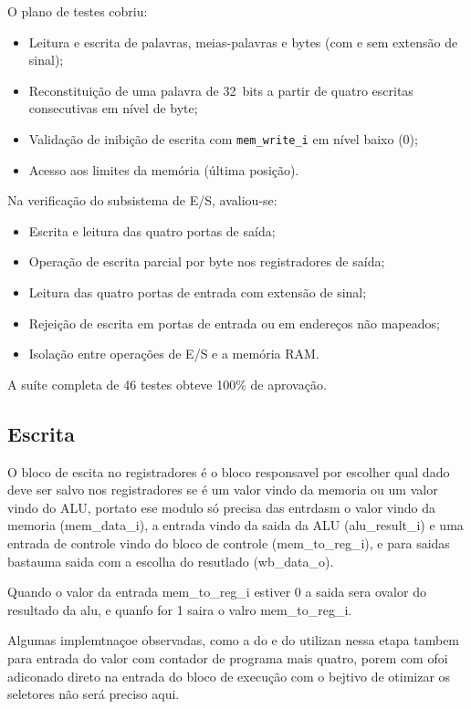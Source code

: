 O plano de testes cobriu:
\begin{itemize}
    \item Leitura e escrita de palavras, meias-palavras e bytes (com e sem extensão de sinal);
    \item Reconstituição de uma palavra de 32~bits a partir de quatro escritas consecutivas em nível de byte;
    \item Validação de inibição de escrita com \texttt{mem\_write\_i} em nível baixo (0);
    \item Acesso aos limites da memória (última posição).
\end{itemize}

Na verificação do subsistema de E/S, avaliou-se:
\begin{itemize}
    \item Escrita e leitura das quatro portas de saída;
    \item Operação de escrita parcial por byte nos registradores de saída;
    \item Leitura das quatro portas de entrada com extensão de sinal;
    \item Rejeição de escrita em portas de entrada ou em endereços não mapeados;
    \item Isolação entre operações de E/S e a memória RAM.
\end{itemize}

A suíte completa de 46 testes obteve 100\% de aprovação.

\subsection{Escrita}
\label{sub:escrita}

O bloco de escita no registradores é o bloco responsavel por escolher qual dado deve ser salvo nos registradores se é um valor vindo da memoria ou um valor vindo do ALU, portato ese modulo só precisa das entrdasm o valor vindo da memoria (mem_data_i), a entrada vindo da saida da ALU (alu_result_i) e uma entrada de controle vindo do bloco de controle (mem_to_reg_i), e para saidas bastauma saida com a escolha do resutlado (wb_data_o).

Quando o valor da entrada mem_to_reg_i estiver 0 a saida sera ovalor do resultado da alu, e quanfo for 1 saira o valro mem_to_reg_i. 

Algumas implemtnaçoe  observadas, como a do e do  utilizan nessa etapa tambem para entrada do valor com contador de programa mais quatro, porem com ofoi adiconado direto na entrada do bloco de execução com o bejtivo de otimizar os seletores não será preciso aqui.

